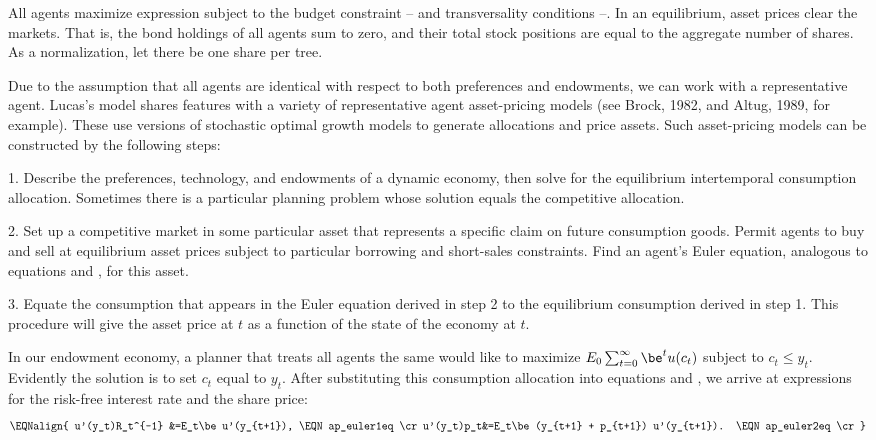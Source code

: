 All agents maximize expression  subject to the
budget constraint -- and transversality
conditions --. In an equilibrium, asset prices
clear the markets. That is, the bond holdings of all
agents sum to zero, and their total stock positions are equal to
the aggregate number of shares. As a normalization, let there be
one share per tree.

Due to the assumption that all agents are identical with respect to both
preferences and endowments, we can work with a representative
agent.
Lucas's model shares features with a variety of
representative agent asset-pricing models (see Brock, 1982, and Altug,
1989, for example).  These use versions of stochastic optimal growth models
to generate allocations and price assets.
Such asset-pricing models can be constructed by the following
steps:
%



\medskip

\item{1.} Describe the preferences, technology, and endowments of a dynamic
economy, then solve for the equilibrium intertemporal consumption allocation.
Sometimes there is a particular  planning problem
whose solution equals the competitive allocation.

\medskip

\item{2.} Set up a competitive market in some particular asset that
represents a specific claim on future consumption goods.  Permit
agents to buy and sell at equilibrium asset prices subject to particular
borrowing and short-sales constraints.  Find an agent's Euler equation,
analogous to equations  and , for this asset.

\medskip

\item{3.} Equate the consumption that appears in the Euler equation
derived in step 2 to the equilibrium consumption derived in step 1.
This procedure will give the asset price at $t$ as a function of the
state of the economy at $t$.

\medskip
\noindent
In our endowment economy, a planner that treats all agents the same
would like to maximize
$E_0\sum_{t=0}^\infty \be^t u(c_t)$ subject to $c_t\le y_t$.  Evidently the
solution is to set $c_t$ equal to $y_t$. After substituting this
consumption allocation into equations
 and , we arrive
at expressions for the risk-free interest rate and
the share price:
$$\EQNalign{
u'(y_t)R_t^{-1} &=E_t\be u'(y_{t+1}),                       \EQN ap_euler1eq  \cr
u'(y_t)p_t&=E_t\be (y_{t+1} + p_{t+1}) u'(y_{t+1}).    \EQN ap_euler2eq  \cr}
$$

